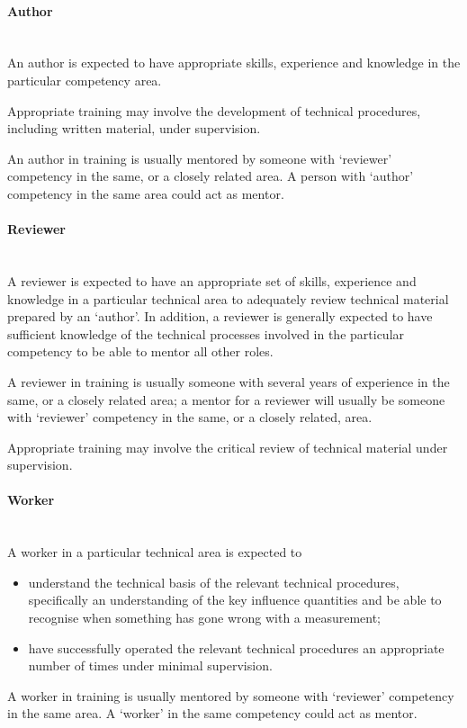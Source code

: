 \paragraph{Author} \mbox{}\\
An author is expected to have appropriate skills, experience and knowledge in the particular competency area.

Appropriate training may involve the development of technical procedures, including written material, under supervision.

An author in training is usually mentored by someone with ‘reviewer' competency in the same, or a closely related area. A person with ‘author' competency in the same area could act as mentor.
 
\paragraph{Reviewer} \mbox{}\\
A reviewer is expected to have an appropriate set of skills, experience and knowledge in a particular technical area to adequately review technical material prepared by an ‘author'.  In addition, a reviewer is generally expected to have sufficient knowledge of the technical processes involved in the particular competency to be able to mentor all other roles.

A reviewer in training is usually someone with several years of experience in the same, or a closely related area; a mentor for a reviewer will usually be someone with ‘reviewer' competency in the same, or a closely related, area. 

Appropriate training may involve the critical review of technical material under supervision.
 
\paragraph{Worker} \mbox{}\\
A worker in a particular technical area is expected to 
\begin{itemize}
\item understand the technical basis of the relevant technical procedures, specifically an understanding of the key influence quantities and be able to recognise when something has gone wrong with a measurement;
\item have successfully operated the relevant technical procedures an appropriate number of times under minimal supervision.
\end{itemize}
A worker in training is usually mentored by someone with ‘reviewer’ competency in the same area. A ‘worker’ in the same competency could act as mentor.

